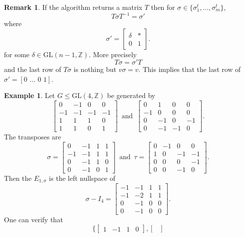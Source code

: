 \documentclass{article}
\theoremstyle{plain}
\theoremstyle{definition}
\newtheorem{example}[theorem]{Example}
\newtheorem*{remark}{Remark}
\newcommand{\Z}{\ensuremath{\mathbb{Z}}}
\newcommand{\tand}{\ensuremath{\,\,\, \text{and} \,\,\,}}
\begin{document}
\begin{remark}
If the algorithm returns a matrix $T$ then for $\sigma \in \lbrace \sigma^t_1, \ldots , \sigma^t_m \rbrace$, 
$$T \sigma T^{-1} = \sigma'$$ where $$\sigma' = \left[ \begin{array}{c|c}
\delta & \ast \\
\hline
0 &1 
\end{array}\right]. 
$$
for some $\delta \in \mathrm{GL}(n-1, \Z)$. More precisely $$T \sigma = \sigma'T$$ and the last row of $T \sigma$ is nothing but $v \sigma = v$. This implies that the last row of $\sigma' = [0 \,\, \ldots \,\, 0 \,\, 1]$.
\end{remark}
\begin{example}
Let $G\leq \mathrm{GL}(4,\Z)$ be generated by 
$$ \left[ \begin {array}{cccc} 0&-1&0&0\\ -1&-1&-1&-1
\\ 1&1&1&0\\ 1&1&0&1\end {array}
 \right] 
\tand
\left[ \begin {array}{cccc} 0&1&0&0\\ -1&0&0&0
\\ 0&-1&0&-1\\ 0&-1&-1&0
\end {array} \right].
$$
The transposes are 
$$
 \sigma = \left[ \begin {array}{cccc} 0&-1&1&1\\ -1&-1&1&1
\\ 0&-1&1&0\\ 0&-1&0&1\end {array}
 \right]
 \tand 
\tau =  \left[ \begin {array}{cccc} 0&-1&0&0\\ 1&0&-1&-1
\\ 0&0&0&-1\\ 0&0&-1&0\end {array}
 \right].
$$ 
Then the $E_{1,\sigma}$ is the left nullspace of 
$$\sigma - I_4 = \left[ \begin {array}{cccc} -1&-1&1&1\\ -1&-2&1&1 \\ 0&-1&0&0\\ 0&-1&0&0\end {array}\right].$$
One can verify that 
\begin{displaymath}
\lbrace \begin{bmatrix}
1& -1 &1 &0
\end{bmatrix}, \begin{bmatrix}

\end{bmatrix}
\end{displaymath}
\end{example}
\end{document}
